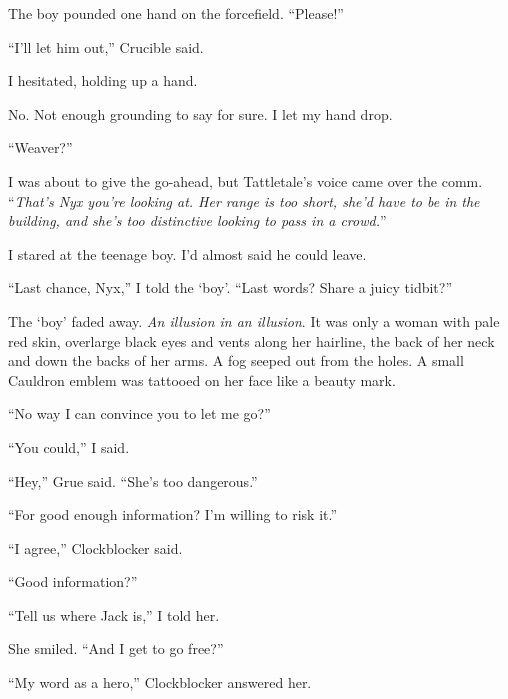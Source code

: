 The boy pounded one hand on the forcefield.  ``Please!''



``I'll let him out,'' Crucible said.



I hesitated, holding up a hand.



No.  Not enough grounding to say for sure.  I let my hand drop.



``Weaver?''



I was about to give the go-ahead, but Tattletale's voice came over the comm.  ``\emph{That's Nyx you're looking at.  Her range is too short, she'd have to be in the building, and she's too distinctive looking to pass in a crowd.}''



I stared at the teenage boy.  I'd almost said he could leave.



``Last chance, Nyx,'' I told the `boy'.  ``Last words?  Share a juicy tidbit?''



The `boy' faded away.  \emph{An illusion in an illusion}.  It was only a woman with pale red skin, overlarge black eyes and vents along her hairline, the back of her neck and down the backs of her arms.  A fog seeped out from the holes.  A small Cauldron emblem was tattooed on her face like a beauty mark.



``No way I can convince you to let me go?''



``You could,'' I said.



``Hey,'' Grue said.  ``She's too dangerous.''



``For good enough information?  I'm willing to risk it.''



``I agree,'' Clockblocker said.



``Good information?''



``Tell us where Jack is,'' I told her.



She smiled.  ``And I get to go free?''



``My word as a hero,'' Clockblocker answered her.



